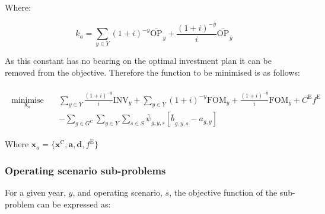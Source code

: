 \documentclass{article}
\newcommand{\sGeneratorsCandidate}{G^{\mathrm{C}}}
\newcommand{\sYears}{Y}
\newcommand{\sScenarios}{S}
\newcommand{\iGenerator}{g}
\newcommand{\iYear}{y}
\newcommand{\iYearTerminal}{\overline{\iYear}}
\newcommand{\iScenario}{s}
\newcommand{\cOperatingCost}[1][\iYear,\iScenario]{\mathrm{OP}_{#1}}
\newcommand{\cFixedOperationsMaintenanceCost}[1][\iGenerator]{\mathrm{FOM}_{#1}}
\newcommand{\cInvestmentCost}[1][\iYear]{\mathrm{INV}_{#1}}
\newcommand{\cInterestRate}{i}
\newcommand{\cEmissionsTargetViolationPenalty}{C^{\mathrm{E}}}
\newcommand{\vEmissionsTargetViolation}{f^{\mathrm{E}}}
\newcommand{\vInstalledCapacityTotal}[1][\iGenerator,\iYear]{a_{#1}}
\newcommand{\vInstalledCapacityTotalScenario}[1][\iGenerator,\iYear,\iScenario]{b_{#1}}
\DeclareMathOperator*{\minimise}{minimise}
\begin{document}
Where:

\begin{equation}
	k_{a} = \sum\limits_{\iYear \in \sYears} (1+\cInterestRate)^{-\iYear} \overline{\cOperatingCost[]}_{\iYear} + \frac{(1+\cInterestRate)^{-\iYearTerminal}}{\cInterestRate} \overline{\cOperatingCost[]}_{\iYearTerminal}
\end{equation}

As this constant has no bearing on the optimal investment plan it can be removed from the objective. Therefore the function to be minimised is as follows:

\begin{align}
	\begin{split}
		\minimise\limits_{\bm{x}_{a}} \quad & \sum\limits_{\iYear \in \sYears} \frac{(1+\cInterestRate)^{-\iYear}}{\cInterestRate}\cInvestmentCost + \sum\limits_{\iYear \in \sYears} (1+\cInterestRate)^{-\iYear} \cFixedOperationsMaintenanceCost[\iYear]  + \frac{(1+\cInterestRate)^{-\iYearTerminal}}{\cInterestRate} \cFixedOperationsMaintenanceCost[\iYearTerminal] + \cEmissionsTargetViolationPenalty \vEmissionsTargetViolation\\
		& - \sum\limits_{\iGenerator \in \sGeneratorsCandidate}\sum\limits_{\iYear \in \sYears}\sum\limits_{\iScenario \in \sScenarios} \overline{\psi}_{\iGenerator,\iYear,\iScenario}\left[\overline{\vInstalledCapacityTotalScenario[]}_{\iGenerator,\iYear,\iScenario} - \vInstalledCapacityTotal\right]
	\end{split}
\end{align}

Where $\bm{x}_{a} = \{\bm{x}^{\mathrm{C}}, \bm{a}, \bm{d}, \vEmissionsTargetViolation\}$

\subsubsection{Operating scenario sub-problems}
For a given year, $\iYear$, and operating scenario, $\iScenario$, the objective function of the sub-problem can be expressed as:
\end{document}
